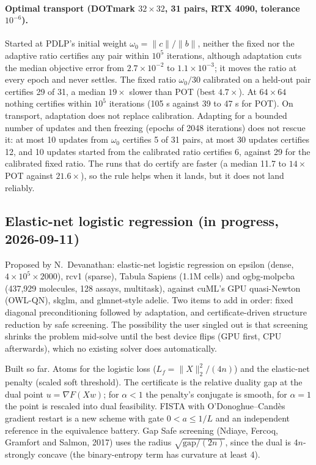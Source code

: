 \paragraph{Optimal transport (DOTmark $32\times32$, 31 pairs, RTX 4090, tolerance $10^{-6}$).}
Started at PDLP's initial weight $\omega_0 = \|c\|/\|b\|$, neither the fixed nor
the adaptive ratio certifies any pair within $10^5$ iterations, although
adaptation cuts the median objective error from $2.7\times10^{-2}$ to
$1.1\times10^{-3}$; it moves the ratio at every epoch and never settles. The
fixed ratio $\omega_0/30$ calibrated on a held-out pair certifies 29 of 31, a
median $19\times$ slower than POT (best $4.7\times$). At $64\times64$ nothing
certifies within $10^5$ iterations (105 s against 39 to 47 s for POT). On
transport, adaptation does not replace calibration.
Adapting for a bounded number of updates and then freezing (epochs of 2048
iterations) does not rescue it: at most 10 updates from $\omega_0$ certifies 5
of 31 pairs, at most 30 updates certifies 12, and 10 updates started from the
calibrated ratio certifies 6, against 29 for the calibrated fixed ratio. The
runs that do certify are faster (a median 11.7 to $14\times$ POT against
$21.6\times$), so the rule helps when it lands, but it does not land reliably.

\subsection{Elastic-net logistic regression (in progress, 2026-09-11)}
\label{app:log:logreg}

Proposed by N.~Devanathan: elastic-net logistic regression on epsilon (dense,
$4\times10^5\times2000$), rcv1 (sparse), Tabula Sapiens (1.1M cells) and
ogbg-molpcba (437,929 molecules, 128 assays, multitask), against cuML's GPU
quasi-Newton (OWL-QN), skglm, and glmnet-style adelie. Two items to add in
order: fixed diagonal preconditioning followed by adaptation, and
certificate-driven structure reduction by safe screening. The possibility
the user singled out is that screening shrinks the problem mid-solve until
the best device flips (GPU first, CPU afterwards), which no existing solver
does automatically.

Built so far. Atoms for the logistic loss ($L_f = \|X\|_2^2/(4n)$) and the
elastic-net penalty (scaled soft threshold). The certificate is the relative
duality gap at the dual point $u = \nabla F(Xw)$; for $\alpha<1$ the penalty's
conjugate is smooth, for $\alpha=1$ the point is rescaled into dual
feasibility. FISTA with O'Donoghue--Cand\`es gradient restart is a new scheme
with gate $0 < a \le 1/L$ and an independent reference in the equivalence
battery. Gap Safe screening (Ndiaye, Fercoq, Gramfort and Salmon, 2017)
uses the radius $\sqrt{\mathrm{gap}/(2n)}$, since the dual is $4n$-strongly
concave (the binary-entropy term has curvature at least 4).

